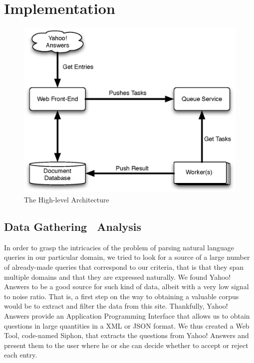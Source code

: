 \chapter{Implementation} %
\label{cha:implementation}

\begin{figure}[ht!]
  \begin{center}
    \includegraphics[width=\linewidth]{images/architecture}
  \end{center}
  \caption{The High-level Architecture}\label{fig:architecture}
\end{figure}


\section{Data Gathering \amper\ Analysis} %
\label{sec:data_gathering_and_analysis}

In order to grasp the intricacies of the problem of parsing natural language queries in our particular domain, we tried to look for a source of a large number of already-made queries that correspond to our criteria, that is that they span multiple domains and that they are expressed naturally. We found Yahoo! Answers to be a good source for such kind of data, albeit with a very low signal to noise ratio. That is, a first step on the way to obtaining a valuable corpus would be to extract and filter the data from this site. Thankfully, Yahoo! Answers provide an Application Programming Interface that allows us to obtain questions in large quantities in a XML or JSON format. We thus created a Web Tool, code-named Siphon, that extracts the questions from Yahoo! Answers and present them to the user where he or she can decide whether to accept or reject each entry.

